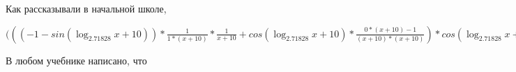 \documentclass[12pt,a4paper,fleqn]{article}
\theoremstyle{definition}
\begin{document}
Как рассказывали в начальной школе,

$((( -1  - sin(\log_{ 2.71828 }{ x  +  10 })) * \frac{ 1 }{ 1  * ( x  +  10 )}
 * \frac{ 1 }{ x  +  10 }
 + cos(\log_{ 2.71828 }{ x  +  10 }) * \frac{ 0  * ( x  +  10 ) -  1 }{( x  +  10 ) * ( x  +  10 )}
) * cos(\log_{ 2.71828 }{ x  +  10 }) * \frac{ 1 }{ x  +  10 }
 * { 3 }^{sin(\log_{ 2.71828 }{ x  +  10 })} + cos(\log_{ 2.71828 }{ x  +  10 }) * \frac{ 1 }{ x  +  10 }
 * ((( -1  - sin(\log_{ 2.71828 }{ x  +  10 })) * \frac{ 1 }{ 1  * ( x  +  10 )}
 * \frac{ 1 }{ x  +  10 }
 + cos(\log_{ 2.71828 }{ x  +  10 }) * \frac{ 0  * ( x  +  10 ) -  1 }{( x  +  10 ) * ( x  +  10 )}
) * { 3 }^{sin(\log_{ 2.71828 }{ x  +  10 })} + cos(\log_{ 2.71828 }{ x  +  10 }) * \frac{ 1 }{ x  +  10 }
 *  1  * cos(\log_{ 2.71828 }{ x  +  10 }) * \frac{ 1 }{ 1  * ( x  +  10 )}
 * { 3 }^{sin(\log_{ 2.71828 }{ x  +  10 })}) = (( -1  - sin(\log_{ 2.71828 }{ x  +  10 })) * \frac{ 1 }{ 1  * ( x  +  10 )}
 * \frac{ 1 }{ x  +  10 }
 + cos(\log_{ 2.71828 }{ x  +  10 }) * \frac{ 0  * ( x  +  10 ) -  1 }{( x  +  10 ) * ( x  +  10 )}
) * cos(\log_{ 2.71828 }{ x  +  10 }) * \frac{ 1 }{ x  +  10 }
 * { 3 }^{sin(\log_{ 2.71828 }{ x  +  10 })} + cos(\log_{ 2.71828 }{ x  +  10 }) * \frac{ 1 }{ x  +  10 }
 * ((( -1  - sin(\log_{ 2.71828 }{ x  +  10 })) * \frac{ 1 }{ 1  * ( x  +  10 )}
 * \frac{ 1 }{ x  +  10 }
 + cos(\log_{ 2.71828 }{ x  +  10 }) * \frac{ 0  * ( x  +  10 ) -  1 }{( x  +  10 ) * ( x  +  10 )}
) * { 3 }^{sin(\log_{ 2.71828 }{ x  +  10 })} + cos(\log_{ 2.71828 }{ x  +  10 }) * \frac{ 1 }{ x  +  10 }
 *  1  * cos(\log_{ 2.71828 }{ x  +  10 }) * \frac{ 1 }{ 1  * ( x  +  10 )}
 * { 3 }^{sin(\log_{ 2.71828 }{ x  +  10 })})$

В любом учебнике написано, что
\end{document}
